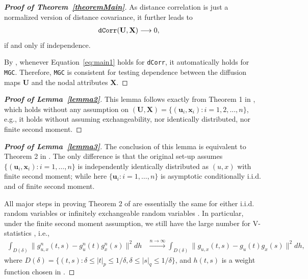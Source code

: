 \documentclass[12pt]{article}
\theoremstyle{definition}
\begin{document}
\begin{proof}[\textbf{Proof of Theorem~\ref{theoremMain}}]
		As distance correlation is just a normalized version of distance covariance, it further leads to
		\begin{eqnarray}
		\mbox{\texttt{dCorr}}(\mathbf{U},\mathbf{X}) &\longrightarrow 0,
		\label{eq:main1}
		\end{eqnarray}
		if and only if independence.
		
		By \cite{shen2016discovering}, whenever Equation~\ref{eq:main1} holds for \texttt{dCorr}, it automatically holds for \texttt{MGC}. Therefore, \texttt{MGC} is consistent for testing dependence between the diffusion maps $\mathbf{U}$ and the nodal attributes $\mathbf{X}$.
	\end{proof}
	
	\begin{proof}[\textbf{Proof of Lemma~\ref{lemma2}}] 
		This lemma follows exactly from Theorem 1 in \cite{szekely2007measuring}, which holds without any assumption on $(\mathbf{U}, \mathbf{X} ) =  \{(\mathbf{u}_{i},\mathbf{x}_{i}) :  i=1,2,...,n\}$, e.g., it holds without assuming exchangeability, nor identically distributed, nor finite second moment.
	\end{proof}
	
	\begin{proof}[\textbf{Proof of Lemma~\ref{lemma3}}] 
		The conclusion of this lemma is equivalent to Theorem 2 in \cite{szekely2007measuring}. The only difference is that the original set-up assumes $\{(\mathbf{u}_{i},\mathbf{x}_{i}) : i = 1, \ldots , n \}$ is independently identically distributed as $(u,x)$ with finite second moment; while here $\{  \mathbf{u}_{i} : i = 1, \ldots, n  \}$ is asymptotic conditionally i.i.d. and of finite second moment.
		
		All major steps in proving Theorem 2 of \cite{szekely2007measuring} are essentially the same for either i.i.d. random variables or infinitely exchangeable random variables \citep{InoueTaylor2006}. In particular, under the finite second moment assumption, we still have the large number for V-statistics \citep{KoroljukBook}, i.e., 
		\begin{eqnarray}
		\displaystyle\int_{D(\delta)}{\|g_{u,x}^{n}(t,s)-g_{u}^{n}(t)g_{x}^{n}(s)\|^{2}}dh &\stackrel{n \rightarrow \infty}{\longrightarrow} 
		\displaystyle\int_{D(\delta)}{\|g_{u,x}(t,s)-g_{u}(t)g_{x}(s)\|^{2}}dh,
		\label{eq:SLLN}
		\end{eqnarray}
		where $D(\delta)=\{(t,s):\delta \leq |t|_{p} \leq 1/\delta,\delta \leq |s|_{q} \leq 1/\delta\}$, and $h(t,s)$ is a weight function chosen in \cite{szekely2007measuring}. 
	\end{proof}
	
\end{document}
